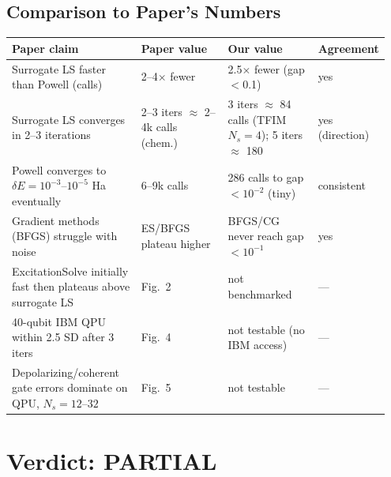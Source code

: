 \documentclass[11pt]{article}
\begin{document}
\subsection{Comparison to Paper's Numbers}

\begin{longtable}{p{0.35\linewidth}p{0.25\linewidth}p{0.25\linewidth}p{0.1\linewidth}}
\toprule
Paper claim & Paper value & Our value & Agreement \\
\midrule
Surrogate LS faster than Powell (calls) & 2--4$\times$ fewer & 2.5$\times$ fewer (gap$<$0.1) & yes \\
Surrogate LS converges in 2--3 iterations & 2--3 iters $\approx$ 2--4k calls (chem.) & 3 iters $\approx$ 84 calls (TFIM $N_s{=}4$); 5 iters $\approx$ 180 & yes (direction) \\
Powell converges to $\delta E{=}10^{-3}$--$10^{-5}$ Ha eventually & 6--9k calls & 286 calls to gap$<10^{-2}$ (tiny) & consistent \\
Gradient methods (BFGS) struggle with noise & ES/BFGS plateau higher & BFGS/CG never reach gap$<10^{-1}$ & yes \\
ExcitationSolve initially fast then plateaus above surrogate LS & Fig.~2 & not benchmarked & --- \\
40-qubit IBM QPU within 2.5 SD after 3 iters & Fig.~4 & not testable (no IBM access) & --- \\
Depolarizing/coherent gate errors dominate on QPU, $N_s{=}12$--$32$ & Fig.~5 & not testable & --- \\
\bottomrule
\end{longtable}

\section{Verdict: PARTIAL}
\end{document}
